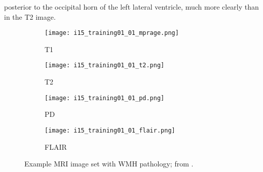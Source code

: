 posterior to the occipital horn of the left lateral ventricle,
much more clearly than in the T2 image.
\begin{figure}
  \centering
  \begin{subfigure}{0.24\textwidth}\texttt{[image: i15\_training01\_01\_mprage.png]}\caption{T1}  \label{fig:4mriT1}\end{subfigure}
  \begin{subfigure}{0.24\textwidth}\texttt{[image: i15\_training01\_01\_t2.png]}\caption{T2}      \label{fig:4mriT2}\end{subfigure}
  \begin{subfigure}{0.24\textwidth}\texttt{[image: i15\_training01\_01\_pd.png]}\caption{PD}      \label{fig:4mriPD}\end{subfigure}
  \begin{subfigure}{0.24\textwidth}\texttt{[image: i15\_training01\_01\_flair.png]}\caption{FLAIR}\label{fig:4mriIR}\end{subfigure}
  \caption{Example MRI image set with WMH pathology; from \cite{WMHSEG2017}.}
  \label{fig:4mri}
\end{figure}
